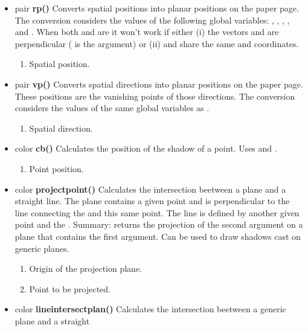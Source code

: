 \begin{itemize}
\item pair {\bfseries rp()} Converts spatial positions into
planar positions on the paper page. The conversion
considers the values of the following global
variables: ,
, ,
,  and . When both
 and 
are  it won't work if either (i) the
vectors  and  are
perpendicular ( is the argument) or (ii)
 and  share the same
 and  coordinates. 
\begin{enumerate}
\item {} Spatial position.
\end{enumerate}
\item pair {\bfseries vp()} Converts spatial directions into
planar positions on the paper page. These positions are the
vanishing points of those directions. The conversion
considers the values of the same global
variables as .
\begin{enumerate}
\item {} Spatial direction.
\end{enumerate}
\item color {\bfseries cb()} Calculates the position of the
shadow of a point. Uses  and
.
\begin{enumerate}
\item {} Point position.
\end{enumerate}
\item color {\bfseries projectpoint()} Calculates the
intersection beetween a plane and a straight
line. The plane contains a given point and is
perpendicular to the line connecting the
 and this same point.
The line is defined by another given point and the
. Summary: 
returns the projection of the second argument on a
plane that contains the first argument. Can be used to
draw shadows cast on generic planes.
\begin{enumerate}
\item {} Origin of the projection plane.
\item {} Point to be projected.
\end{enumerate}
\item color {\bfseries lineintersectplan()} Calculates the
intersection beetween a generic plane and a straight

\end{itemize}
